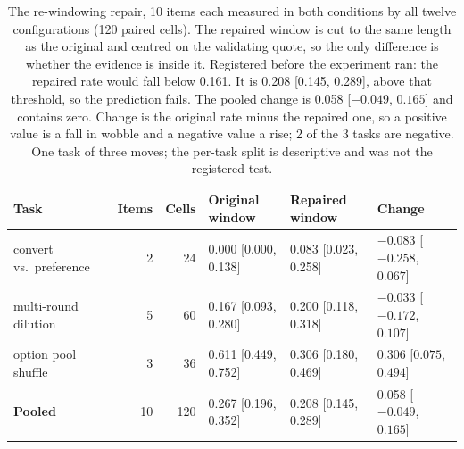 \begin{table}[t]
\centering
\footnotesize
\setlength{\tabcolsep}{5pt}
\begin{tabular}{l r r l l l}
\toprule
Task & Items & Cells & Original window & Repaired window & Change \\
\midrule
convert vs.\ preference & 2 & 24 & 0.000 [0.000, 0.138] & 0.083 [0.023, 0.258] & $-$0.083 [$-0.258$, $0.067$] \\
multi-round dilution & 5 & 60 & 0.167 [0.093, 0.280] & 0.200 [0.118, 0.318] & $-$0.033 [$-0.172$, $0.107$] \\
option pool shuffle & 3 & 36 & 0.611 [0.449, 0.752] & 0.306 [0.180, 0.469] & 0.306 [$0.075$, $0.494$] \\
\midrule
\textbf{Pooled} & 10 & 120 & 0.267 [0.196, 0.352] & 0.208 [0.145, 0.289] & 0.058 [$-0.049$, $0.165$] \\
\bottomrule
\end{tabular}
\caption{The re-windowing repair, 10 items each measured in both conditions by all twelve configurations (120 paired cells). The repaired window is cut to the same length as the original and centred on the validating quote, so the only difference is whether the evidence is inside it. Registered before the experiment ran: the repaired rate would fall below 0.161. It is 0.208 [0.145, 0.289], above that threshold, so the prediction fails. The pooled change is 0.058 [$-0.049$, $0.165$] and contains zero. Change is the original rate minus the repaired one, so a positive value is a fall in wobble and a negative value a rise; 2 of the 3 tasks are negative. One task of three moves; the per-task split is descriptive and was not the registered test.}
\label{tab:repair}
\end{table}
